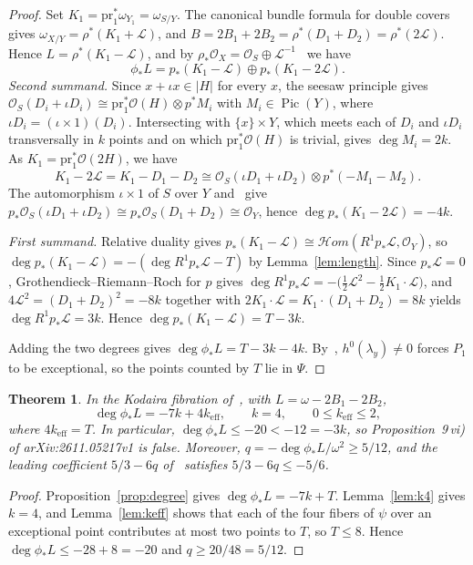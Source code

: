 \documentclass[11pt]{article}
\newtheorem{theorem}{Theorem}[section]
\theoremstyle{definition}
\theoremstyle{remark}
\DeclareMathOperator{\Pic}{Pic}
\newcommand{\OO}{\mathcal{O}}
\newcommand{\cL}{\mathcal{L}}
\begin{document}
\begin{proof}
Set $K_1=\mathrm{pr}_1^*\omega_{Y_1}=\omega_{S/Y}$. The canonical bundle formula
for double covers~\cite[I.17]{BHPV04} gives $\omega_{X/Y}=\rho^*(K_1+\cL)$, and
$B=2B_1+2B_2=\rho^*(D_1+D_2)=\rho^*(2\cL)$. Hence $L=\rho^*(K_1-\cL)$, and by
$\rho_*\OO_X=\OO_S\oplus\cL^{-1}$~\cite[(13)]{So26} we have
\[
\phi_*L=p_*(K_1-\cL)\oplus p_*(K_1-2\cL).
\]
\emph{Second summand.} Since $x+\iota x\in|H|$ for every $x$, the seesaw principle
gives $\OO_S(D_i+\iota D_i)\cong\mathrm{pr}_1^*\OO(H)\otimes p^*M_i$ with
$M_i\in\Pic(Y)$, where $\iota D_i=(\iota\times 1)(D_i)$. Intersecting with
$\{x\}\times Y$, which meets each of $D_i$ and $\iota D_i$ transversally in $k$
points and on which $\mathrm{pr}_1^*\OO(H)$ is trivial, gives $\deg M_i=2k$. As
$K_1=\mathrm{pr}_1^*\OO(2H)$, we have
\[
K_1-2\cL=K_1-D_1-D_2\cong\OO_S(\iota D_1+\iota D_2)\otimes p^*(-M_1-M_2).
\]
The automorphism $\iota\times 1$ of $S$ over $Y$ and~\cite[(20)]{So26} give
$p_*\OO_S(\iota D_1+\iota D_2)\cong p_*\OO_S(D_1+D_2)\cong\OO_Y$, hence
$\deg p_*(K_1-2\cL)=-4k$.

\emph{First summand.} Relative duality gives
$p_*(K_1-\cL)\cong\mathcal{H}om(R^1p_*\cL,\OO_Y)$, so
$\deg p_*(K_1-\cL)=-(\deg R^1p_*\cL-T)$ by Lemma~\ref{lem:length}. Since
$p_*\cL=0$, Grothendieck--Riemann--Roch for $p$ gives
$\deg R^1p_*\cL=-\bigl(\tfrac12\cL^2-\tfrac12K_1\cdot\cL\bigr)$, and
$4\cL^2=(D_1+D_2)^2=-8k$ together with $2K_1\cdot\cL=K_1\cdot(D_1+D_2)=8k$ yields
$\deg
R^1p_*\cL=3k$. Hence $\deg p_*(K_1-\cL)=T-3k$.

Adding the two degrees gives $\deg\phi_*L=T-3k-4k$. By~\cite[Prop.~5\,ii)]{So26},
$h^0(\lambda_y)\ne 0$ forces $P_1$ to be exceptional, so the points counted by $T$
lie in $\Psi$.
\end{proof}

\begin{theorem}\label{thm:soule-count}
In the Kodaira fibration of~\cite{So26}, with $L=\omega-2B_1-2B_2$,
\[
\deg\phi_*L=-7k+4k_{\mathrm{eff}},\qquad k=4,\qquad 0\le k_{\mathrm{eff}}\le 2,
\]
where $4k_{\mathrm{eff}}=T$. In particular, $\deg\phi_*L\le-20<-12=-3k$, so
Proposition~9\,vi) of arXiv:2611.05217v1 is false. Moreover,
$q=-\deg\phi_*L/\omega^2\ge 5/12$, and the leading coefficient $5/3-6q$
of~\cite[(36)]{So26} satisfies $5/3-6q\le-5/6$.
\end{theorem}

\begin{proof}
Proposition~\ref{prop:degree} gives $\deg\phi_*L=-7k+T$. Lemma~\ref{lem:k4} gives
$k=4$, and Lemma~\ref{lem:keff} shows that each of the four fibers of $\psi$ over
an exceptional point contributes at most two points to $T$, so $T\le 8$. Hence
$\deg\phi_*L\le-28+8=-20$ and $q\ge 20/48=5/12$.
\end{proof}
\end{document}
